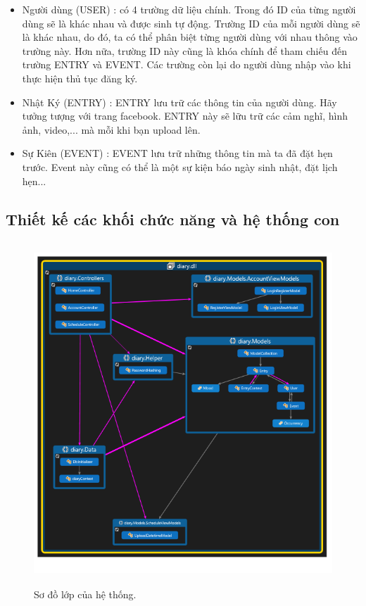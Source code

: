 \documentclass[a4paper]{article}
\begin{document}
\begin{itemize}
	\item Người dùng (USER) : có 4 trường dữ liệu chính. Trong đó ID của từng người dùng sẽ là khác nhau và được sinh tự động. Trường ID của mỗi người dùng sẽ là khác nhau, do đó, ta có thể phân biệt từng người dùng với nhau thông vào trường này. Hơn nữa, trường ID này cũng là khóa chính để tham chiếu đến trường ENTRY và EVENT. Các trường còn lại do người dùng nhập vào khi thực hiện thủ tục đăng ký.

	\item Nhật Ký (ENTRY) : ENTRY lưu trữ các thông tin của người dùng. Hãy tưởng tượng với trang facebook. ENTRY này sẽ lữu trữ các cảm nghĩ, hình ảnh, video,... mà mỗi khi bạn upload lên.

	\item Sự Kiên (EVENT) : EVENT lưu trữ những thông tin mà ta đã đặt hẹn trước. Event này cũng có thể là một sự kiện báo ngày sinh nhật, đặt lịch hẹn...

\end{itemize}


\subsection{Thiết kế các khối chức năng và hệ thống con}

\begin{figure}[!h]
	  \centering
      \includegraphics[height=365pt,width=320pt]{Images/h2.png}
	  \caption{Sơ đồ lớp của hệ thống.}
	  \label{mainbook2}
	 \end{figure}
\end{document}
